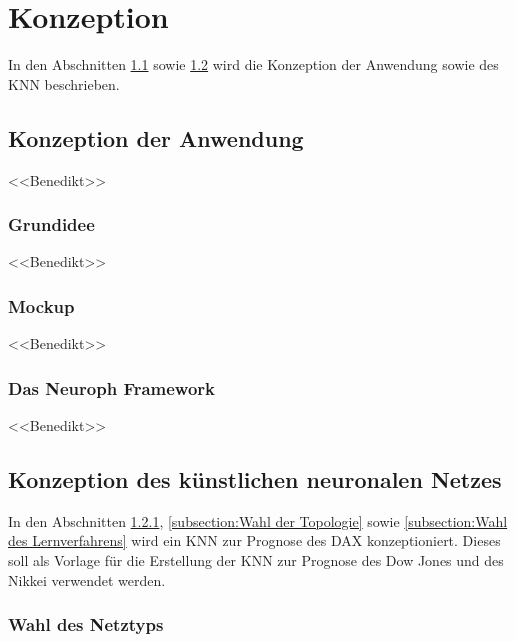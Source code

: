 \chapter{Konzeption}
\label{chapter:Konzeption}

In den Abschnitten \ref{section:Konzeption der Anwendung} sowie \ref{section:Konzeption des künstlichen neuronalen Netzes} wird die Konzeption der Anwendung sowie des KNN beschrieben.

\section{Konzeption der Anwendung}
\label{section:Konzeption der Anwendung} 

<<Benedikt>>
\Blindtext

\subsection{Grundidee}
\label{subsection:Grundidee}

<<Benedikt>>
\Blindtext

\subsection{Mockup}
\label{subsection:Mockup}

<<Benedikt>>
\Blindtext

\subsection{Das Neuroph Framework}
\label{subsection:Das Neuroph Framework}

<<Benedikt>>
\Blindtext

\section{Konzeption des künstlichen neuronalen Netzes}
\label{section:Konzeption des künstlichen neuronalen Netzes}

In den Abschnitten \ref{subsection:Wahl des Netztyps}, \ref{subsection:Wahl der Topologie} sowie \ref{subsection:Wahl des Lernverfahrens} wird ein KNN zur Prognose des DAX konzeptioniert. Dieses soll als Vorlage für die Erstellung der KNN zur Prognose des Dow Jones und des Nikkei verwendet werden.

\subsection{Wahl des Netztyps}
\label{subsection:Wahl des Netztyps}

